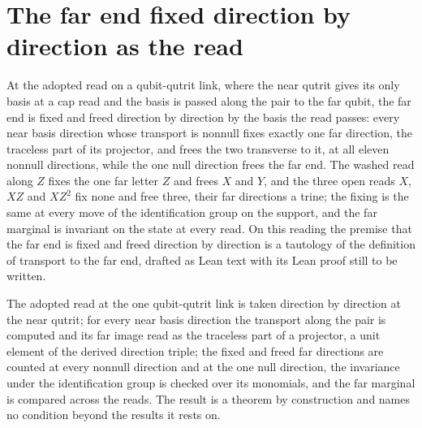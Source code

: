 \section{The far end fixed direction by direction as the read}\label{mod:I-1-D535360-ndfe-t1}
\begin{chtheorem}\label{box:I-1-D535360-ndfe-t1:1}
At the adopted read on a qubit-qutrit link, where the near qutrit gives its only basis at a cap read and the basis is passed along the pair to the far qubit, the far end is fixed and freed direction by direction by the basis the read passes: every near basis direction whose transport is nonnull fixes exactly one far direction, the traceless part of its projector, and frees the two transverse to it, at all eleven nonnull directions, while the one null direction frees the far end. The washed read along $Z$ fixes the one far letter $Z$ and frees $X$ and $Y$, and the three open reads $X$, $XZ$ and $XZ^{2}$ fix none and free three, their far directions a trine; the fixing is the same at every move of the identification group on the support, and the far marginal is invariant on the state at every read. On this reading the premise that the far end is fixed and freed direction by direction is a tautology of the definition of transport to the far end, drafted as Lean text with its Lean proof still to be written.
\end{chtheorem}
The adopted read at the one qubit-qutrit link is taken direction by direction at the near qutrit; for every near basis direction the transport along the pair is computed and its far image read as the traceless part of a projector, a unit element of the derived direction triple; the fixed and freed far directions are counted at every nonnull direction and at the one null direction, the invariance under the identification group is checked over its monomials, and the far marginal is compared across the reads. The result is a theorem by construction and names no condition beyond the results it rests on.

